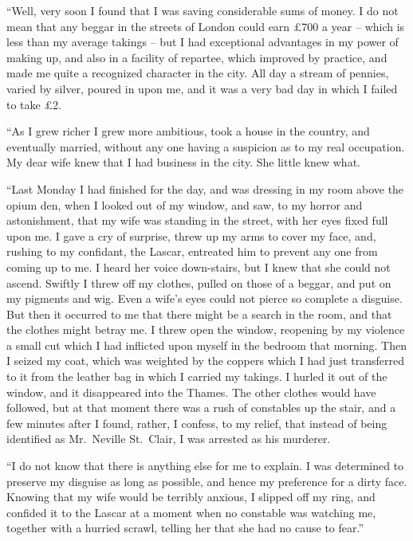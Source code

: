 “Well, very soon I found that I was saving considerable
sums of money. I do not mean that any beggar in the streets
of London could earn £700 a year -- which is less than my
average takings -- but I had exceptional advantages in my
power of making up, and also in a facility of repartee, which
improved by practice, and made me quite a recognized character
in the city. All day a stream of pennies, varied by
silver, poured in upon me, and it was a very bad day in which I
failed to take £2.

“As I grew richer I grew more ambitious, took a house in
the country, and eventually married, without any one having a
suspicion as to my real occupation. My dear wife knew that
I had business in the city. She little knew what.

“Last Monday I had finished for the day, and was dressing
in my room above the opium den, when I looked out of my
window, and saw, to my horror and astonishment, that my
wife was standing in the street, with her eyes fixed full upon
me. I gave a cry of surprise, threw up my arms to cover my
face, and, rushing to my confidant, the Lascar, entreated him
to prevent any one from coming up to me. I heard her voice
down-stairs, but I knew that she could not ascend. Swiftly I
threw off my clothes, pulled on those of a beggar, and put on
my pigments and wig. Even a wife’s eyes could not pierce so
complete a disguise. But then it occurred to me that there
might be a search in the room, and that the clothes might betray
me. I threw open the window, reopening by my violence
a small cut which I had inflicted upon myself in the bedroom
that morning. Then I seized my coat, which was weighted
by the coppers which I had just transferred to it from the
leather bag in which I carried my takings. I hurled it out of
the window, and it disappeared into the Thames. The other
clothes would have followed, but at that moment there was a
rush of constables up the stair, and a few minutes after I
found, rather, I confess, to my relief, that instead of being
identified as Mr.~Neville St.~Clair, I was arrested as his
murderer.

“I do not know that there is anything else for me to explain.
I was determined to preserve my disguise as long as
possible, and hence my preference for a dirty face. Knowing
that my wife would be terribly anxious, I slipped off my
ring, and confided it to the Lascar at a moment when no
constable was watching me, together with a hurried scrawl,
telling her that she had no cause to fear.”

